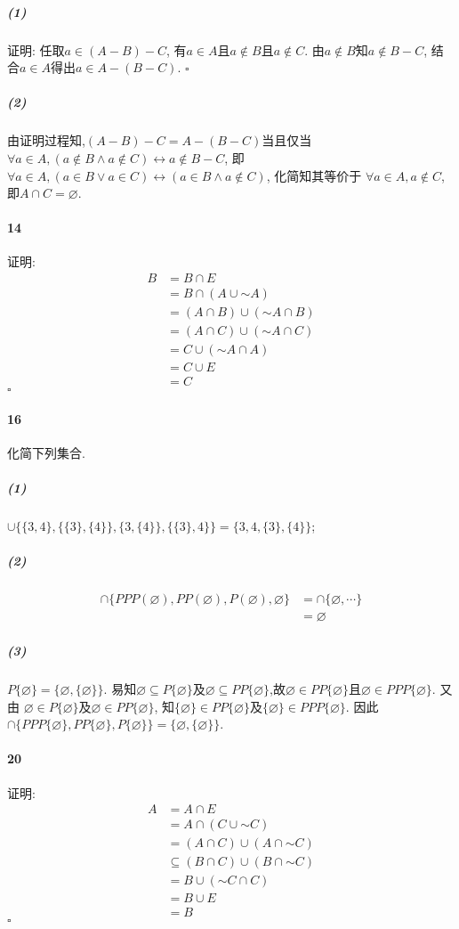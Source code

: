 \documentclass{ctexart}
\def\QED{\hfill $\square$}
\begin{document}
\subparagraph*{(1)} 证明: 任取$a\in(A-B)-C$, 有$a\in A$且$a\notin B$且$a\notin C$. 由$a\notin B$知$a\notin B-C$, 结合$a\in A$得出$a\in A-(B-C)$. \QED
\subparagraph*{(2)} 由证明过程知,$(A-B)-C=A-(B-C)$当且仅当$\forall a\in A, (a\notin B \wedge a\notin C)\leftrightarrow a\notin B-C$, 即$\forall a\in A, (a\in B \vee a\in C) \leftrightarrow (a\in B\wedge a\notin C)$, 化简知其等价于 $\forall a\in A, a\notin C$, 即$A\cap C=\varnothing$. 

\paragraph*{14} 证明:
\begin{align*}
    B&=B\cap E\\
    &=B\cap (A\cup \mathord{\sim} A)\\
    &=(A\cap B)\cup (\mathord{\sim} A\cap B)\\
    &=(A\cap C)\cup (\mathord{\sim} A\cap C)\\
    &=C\cup (\mathord{\sim} A\cap A)\\
    &=C\cup E\\
    &=C    
\end{align*}
\QED

\paragraph*{16} 化简下列集合.

\subparagraph*{(1)} $\cup\{ \{3,4\}, \{ \{3\},\{4\} \}, \{ 3,\{4\} \}, \{ \{3\},4 \} \} = \{3,4,\{3\},\{4\} \}$;

\subparagraph*{(2)} \begin{align*}
    \cap \{PPP(\varnothing),PP(\varnothing),P(\varnothing),\varnothing\} &= \cap \{\varnothing,\cdots\}\\
        &=\varnothing
\end{align*}

\subparagraph*{(3)} $P\{\varnothing\}=\{\varnothing, \{\varnothing\}\}$. 易知$\varnothing\subseteq P\{\varnothing\}$及$\varnothing\subseteq PP\{\varnothing\}$,故$\varnothing\in PP\{\varnothing\}$且$\varnothing\in PPP\{\varnothing\}$. 又由 $\varnothing\in P\{\varnothing\}$及$\varnothing\in PP\{\varnothing\}$, 知$\{\varnothing\}\in PP\{\varnothing\}$及$\{\varnothing\}\in PPP\{\varnothing\}$. 因此 $\cap \{PPP\{\varnothing\},PP\{\varnothing\},P\{\varnothing\}\}=\{\varnothing, \{\varnothing\}\}$.

\paragraph*{20} 证明:
\begin{align*}
    A&=A\cap E\\
    &=A\cap (C\cup \mathord{\sim} C)\\
    &=(A\cap C)\cup (A\cap \mathord{\sim} C)\\
    &\subseteq(B\cap C)\cup (B\cap \mathord{\sim} C)\\
    &=B\cup (\mathord{\sim} C\cap C)\\
    &=B\cup E\\
    &=B    
\end{align*}
\QED
\end{document}
